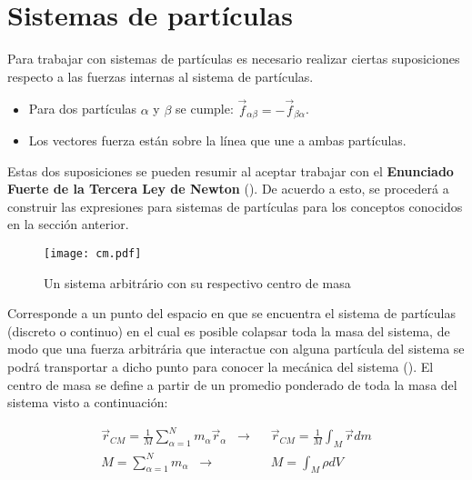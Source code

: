 \documentclass[/home/hernan/Documentos/Apuntes_mecanica_teorica/main.tex]{subfiles}
\begin{document}
    \section{Sistemas de partículas}
    \label{sec: sisparticulas}

    Para trabajar con sistemas de partículas es necesario realizar ciertas suposiciones respecto a las fuerzas internas al sistema de partículas.

    \begin{itemize}
        \item Para dos partículas $\alpha$ y $\beta$ se cumple: $\vec{f}_{\alpha \beta} = - \vec{f}_{\beta \alpha}$.
        \item Los vectores fuerza están sobre la línea que une a ambas partículas.
    \end{itemize}
    Estas dos suposiciones se pueden resumir al aceptar trabajar con el \textbf{Enunciado Fuerte de la Tercera Ley de Newton}  (). De acuerdo a esto, se procederá a construir las expresiones para sistemas de partículas para los conceptos conocidos en la sección anterior.


    \begin{marginfigure}
        \begin{figure}[H]
            \centering
            \texttt{[image: cm.pdf]}
            \caption{Un sistema arbitrário con su respectivo centro de masa}
            \label{fig: centrodemasa}
        \end{figure}
    \end{marginfigure}

    \begin{definition}
        Corresponde a un punto del espacio en que se encuentra el sistema de partículas (discreto o continuo) en el cual es posible colapsar toda la masa del sistema, de modo que una fuerza arbitrária que interactue con alguna partícula del sistema se podrá transportar a dicho punto para conocer la mecánica del sistema (). El centro de masa se define a partir de un promedio ponderado de toda la masa del sistema visto a continuación:

        \begin{align}
            \vec{r}_{CM} = \frac{1}{M} \sum_{\alpha =1}^{N} m_{\alpha} \vec{r}_{\alpha} \; \; \rightarrow  & \; \; \vec{r}_{CM} = \frac{1}{M} \int_{M} \vec{r} dm \\ 
            M = \sum_{\alpha = 1}^{N} m_{\alpha} \; \; \rightarrow  & \; \; M =  \int_{M}  \rho dV
        \end{align}
        
    \end{definition}
\end{document}
